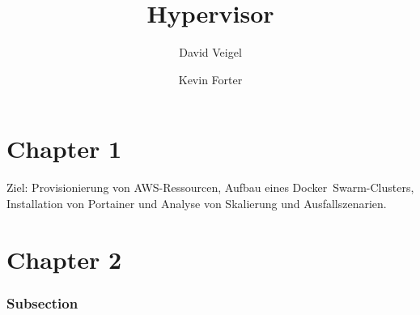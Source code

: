 \documentclass[BMR,Seminar,ngerman,IEEE]{twbook}
\title{Hypervisor}
\author{David Veigel \and Kevin Forter}
\begin{document}
\maketitle

\onecolumn
\newpage

\chapter{Chapter 1}
Ziel: Provisionierung von AWS-Ressourcen, Aufbau eines Docker~Swarm-Clusters, Installation von Portainer und Analyse von Skalierung und Ausfallszenarien.

\chapter{Chapter 2}
\subsection{Subsection}
\end{document}
